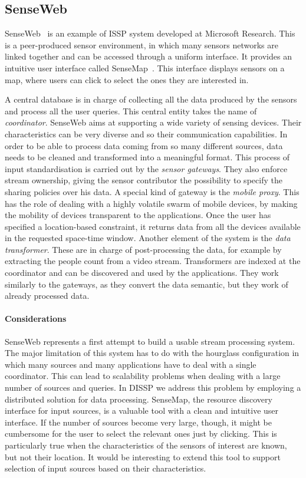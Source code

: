 \subsection*{SenseWeb}
\label{sec:senseweb}

SenseWeb~\cite{senseweb} is an example of ISSP system developed at Microsoft Research. This is a peer-produced sensor
environment, in which many sensors networks are linked together and can be accessed through a uniform interface.  It provides an
intuitive user interface called SenseMap~\cite{sensemap}. This interface displays sensors on a map, where users can
click to select the ones they are interested in.  

A central database is in charge of collecting all the data produced by the sensors and process all the user queries. This
central entity takes the name of \emph{coordinator}.
SenseWeb aims at supporting a wide variety of sensing devices. Their characteristics can be very diverse and so their
communication capabilities.  In order to be able to process data coming from so many different sources, data needs to be
cleaned and transformed into a meaningful format.  This process of input standardisation is carried out by the
\emph{sensor gateways}.  They also enforce stream ownership, giving the sensor contributor the possibility to specify
the sharing policies over his data.  A special kind of gateway is the \emph{mobile proxy}. This has the role of dealing
with a highly volatile swarm of mobile devices, by making the mobility of devices transparent to the applications. Once
the user has specified a location-based constraint, it returns data from all the devices available in the requested
space-time window.  
Another element of the system is the \emph{data transformer}. These are in charge of post-processing
the data, for example by extracting the people count from a video stream. Transformers are indexed at the coordinator
and can be discovered and used by the applications. They work similarly to the gateways, as they convert the data
semantic, but they work of already processed data.

\paragraph{Considerations}SenseWeb represents a first attempt to build a usable stream processing system.
The major limitation of this system has to do with the hourglass configuration in which many
sources and many applications have to deal with a single coordinator.  This can lead to scalability problems when
dealing with a large number of sources and queries. In DISSP we address this problem by employing
a distributed solution for data processing. SenseMap, the resource discovery interface for input sources, is a valuable
tool with a clean and intuitive user interface. If the number of sources become very large, though, it might be
cumbersome for the user to select the relevant ones just by clicking. This is particularly true when the characteristics
of the sensors of interest are known, but not their location. It would be interesting to extend this tool to support
selection of input sources based on their characteristics.

